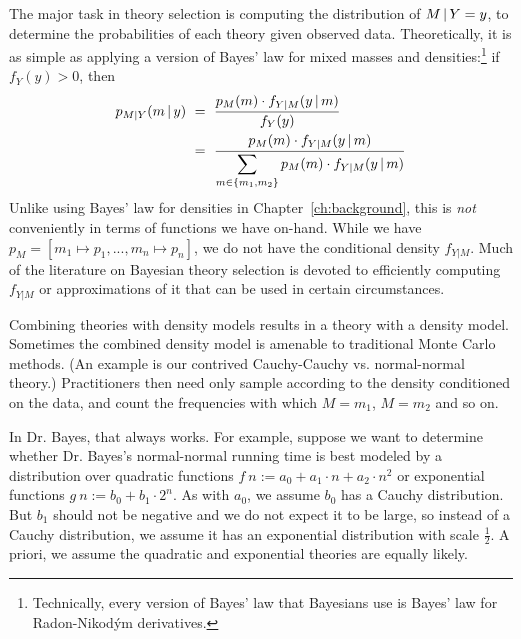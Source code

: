 The major task in theory selection is computing the distribution of $M \,|\, Y = y$, to determine the probabilities of each theory given observed data.
Theoretically, it is as simple as applying a version of Bayes' law for mixed masses and densities:\footnote{Technically, every version of Bayes' law that Bayesians use is Bayes' law for Radon-Nikod\'ym derivatives.} if $f_Y(y) > 0$, then
\begin{equation}
\begin{aligned}
	p_{M|Y}(m \,|\, y)&\ =\ \frac{p_{M}(m) \cdot f_{Y|M}(y \,|\, m)}{f_{Y}(y)}
\\
	&\ =\ \frac{p_{M}(m) \cdot f_{Y|M}(y \,|\, m)}{\displaystyle\sum_{m \in \{{m_1,m_2}\}} p_{M}(m) \cdot f_{Y|M}(y \,|\, m)}
\end{aligned}
\end{equation}
Unlike using Bayes' law for densities in Chapter~\ref{ch:background}, this is \emph{not} conveniently in terms of functions we have on-hand.
While we have $p_M = [m_1 \mapsto p_1, ..., m_n \mapsto p_n]$, we do not have the conditional density $f_{Y|M}$.
Much of the literature on Bayesian theory selection is devoted to efficiently computing $f_{Y|M}$ or approximations of it that can be used in certain circumstances.

Combining theories with density models results in a theory with a density model.
Sometimes the combined density model is amenable to traditional Monte Carlo methods.
(An example is our contrived Cauchy-Cauchy vs. normal-normal theory.)
Practitioners then need only sample according to the density conditioned on the data, and count the frequencies with which $M = m_1$, $M = m_2$ and so on.


In Dr. Bayes, that always works.
For example, suppose we want to determine whether Dr. Bayes's normal-normal running time is best modeled by a distribution over quadratic functions $f~n := a_0 + a_1 \cdot n + a_2 \cdot n^2$ or exponential functions $g~n := b_0 + b_1 \cdot 2^n$.
As with $a_0$, we assume $b_0$ has a Cauchy distribution.
But $b_1$ should not be negative and we do not expect it to be large, so instead of a Cauchy distribution, we assume it has an exponential distribution with scale $\tfrac{1}{2}$.
A priori, we assume the quadratic and exponential theories are equally likely.

